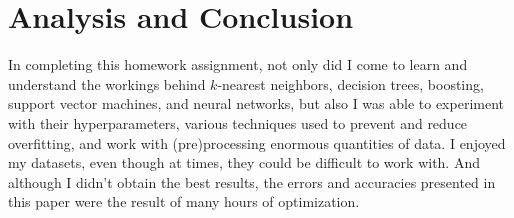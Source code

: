\documentclass[11pt, a4paper]{article} %
\begin{document}







\section{Analysis and Conclusion}
In completing this homework assignment, not only did I come to learn and understand the workings behind $k$-nearest neighbors, decision trees, boosting, support vector machines, and neural networks, but also I was able to experiment with their hyperparameters, various techniques used to prevent and reduce overfitting, and work with (pre)processing enormous quantities of data. I enjoyed my datasets, even though at times, they could be difficult to work with. And although I didn't obtain the best results, the errors and accuracies presented in this paper were the result of many hours of optimization.
\end{document}

